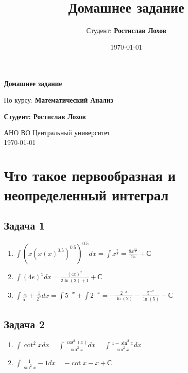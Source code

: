 \documentclass[a4paper,12pt]{article}
\title{Домашнее задание}
\author{Студент: \textbf{Ростислав Лохов}}
\date{\today}
\begin{document}
\begin{titlepage}
	\centering
	\vspace*{1cm}

	\Huge
	\textbf{Домашнее задание}

	\vspace{0.5cm}
	\LARGE
	По курсу: \textbf{Математический Анализ}

	\vspace{1.5cm}

	\textbf{Студент: Ростислав Лохов}

	\vfill

	\Large
	АНО ВО Центральный университет\\
	\vspace{0.3cm}
	\today

\end{titlepage}

\tableofcontents
\newpage

\section{Что такое первообразная и неопределенный интеграл}

\subsection{Задача 1}

\begin{enumerate}
    \item $\int (x(x(x)^{0.5})^{0.5})^{0.5}dx=\int x^{\frac{7}{8}}=\frac{8x^{\frac{15}{8}}}{15} + С$
    \item $\int (4e)^x dx = \frac{(4e)^x}{2\ln(2)+1} + С$
    \item $\int \frac{1}{5^x}+\frac{1}{2^x} dx = \int 5^{-x} + \int 2^{-x} = -\frac{2^{-x}}{\ln(2)} - \frac{5^{-x}}{\ln(5)} + С$
\end{enumerate}


\subsection{Задача 2}
\begin{enumerate}
    \item $\int \cot^2x dx = \int \frac{\cos^2(x)}{\sin^2x} dx= \int \frac{1-\sin^2x}{\sin^2x} dx$
    \item $\int \frac{1}{\sin^2x}-1 dx= -\cot x -x + С$
\end{enumerate}
\end{document}

